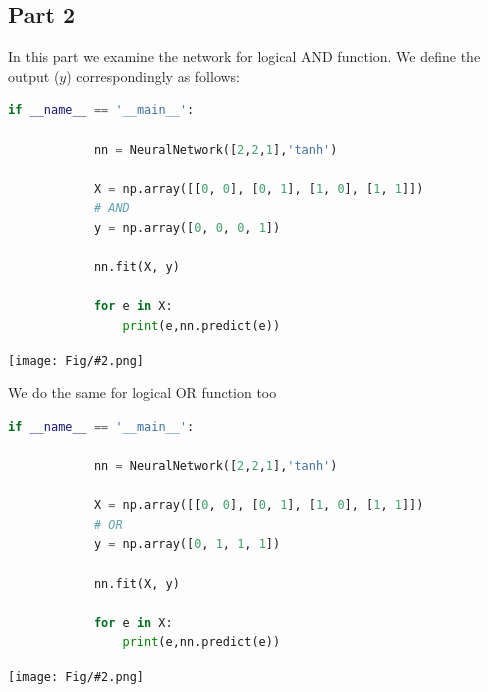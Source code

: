 \documentclass[]{article}
\newcommand{\pict}[2]{\begin{center}
		\texttt{[image: Fig/\#2.png]}
\end{center}}
\begin{document}
	\subsection{Part 2}
	In this part we examine the network for logical AND function. We define the output ($y$) correspondingly as follows:
	\begin{lstlisting}[language=python]
		if __name__ == '__main__':
		
			nn = NeuralNetwork([2,2,1],'tanh')
			
			X = np.array([[0, 0], [0, 1], [1, 0], [1, 1]])
			# AND
			y = np.array([0, 0, 0, 1])
			
			nn.fit(X, y)
			
			for e in X:
				print(e,nn.predict(e))
	\end{lstlisting}
	\pict{0.5}{F9}
	We do the same for logical OR function too
	\begin{lstlisting}[language=python]
		if __name__ == '__main__':
		
			nn = NeuralNetwork([2,2,1],'tanh')
			
			X = np.array([[0, 0], [0, 1], [1, 0], [1, 1]])
			# OR
			y = np.array([0, 1, 1, 1])
			
			nn.fit(X, y)
			
			for e in X:
				print(e,nn.predict(e))
	\end{lstlisting}
	\pict{0.5}{F10}
	
\end{document}

